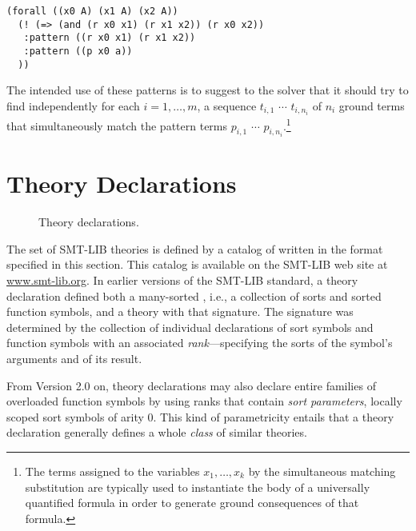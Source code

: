 \begin{lstlisting}[linewidth=31em]
(forall ((x0 A) (x1 A) (x2 A))
  (! (=> (and (r x0 x1) (r x1 x2)) (r x0 x2))
   :pattern ((r x0 x1) (r x1 x2)) 
   :pattern ((p x0 a)) 
  ))
\end{lstlisting}

The intended use of these patterns is to suggest to the solver that it should
try to find independently
for each $i=1,\ldots,m$, a sequence $t_{i,1}$  $\cdots$ $t_{i,n_i}$ of $n_i$ 
ground terms 
that simultaneously match the pattern terms $p_{i,1}$  $\cdots$ $p_{i,n_i}$.\footnote{%
The terms assigned to the variables $x_1, \ldots, x_k$ by the simultaneous 
matching substitution are typically used to instantiate the body 
of a universally quantified formula in order to generate ground consequences 
of that formula.
}

\section{Theory Declarations} \label{sec:theory-declarations}

\begin{figure}
\cTheories
\caption{Theory declarations.}
\label{fig:theory-decls}
\end{figure}

The set of SMT-LIB theories is defined by a catalog of 
written in the format specified in this section.  
This catalog is available on the SMT-LIB web site at \href{http://www.smt-lib.org}{www.smt-lib.org}.
In earlier versions of the SMT-LIB standard,
a theory declaration defined both a many-sorted ,
i.e., a collection of sorts and sorted function symbols,
and a theory with that signature.
The signature was determined by the collection 
of individual declarations of sort symbols
and function symbols with an associated \emph{rank}---specifying
the sorts of the symbol's arguments and of its result.

From Version 2.0 on, 
theory declarations may also declare entire families 
of overloaded function symbols by using ranks that contain 
\emph{sort parameters}, locally scoped sort symbols of arity 0. 
This kind of parametricity entails that a theory declaration generally defines 
a whole \emph{class} of similar theories.

